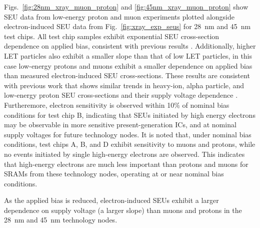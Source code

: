 Figs.~\ref{fig:28nm_xray_muon_proton} and \ref{fig:45nm_xray_muon_proton} show SEU data from low-energy proton and muon experiments plotted alongside electron-induced SEU data from Fig.~\ref{fig:xray_exp_seus} for 28~nm and 45~nm test chips. 
All test chip samples exhibit exponential SEU cross-section dependence on applied bias, consistent with previous results \cite{Rodbell:2007vl, Sierawski:2010cj}. 
Additionally, higher LET particles also exhibit a smaller slope than that of low LET particles, in this case low-energy protons and muons exhibit a smaller dependence on applied bias than measured electron-induced SEU cross-sections.
These results are consistent with previous work that shows similar trends in heavy-ion, alpha particle, and low-energy proton SEU cross-sections and their supply voltage dependence \cite{buehler1990alpha,barak1999scaling,barak2004use,Rodbell:2007vl}. 
Furtheremore, electron sensitivity is observed within 10\% of nominal bias conditions for test chip B, indicating that SEUs initiated by high energy electrons may be observable in more sensitive present-generation ICs, and at nominal supply voltages for future technology nodes.
It is noted that, under nominal bias conditions, test chips A, B, and D exhibit sensitivity to muons and protons, while no events initiated by single high-energy electrons are observed. 
This indicates that high-energy electrons are much less important than protons and muons for SRAMs from these technology nodes, operating at or near nominal bias conditions.

As the applied bias is reduced, electron-induced SEUs exhibit a larger dependence on supply voltage (a larger slope) than muons and protons in the 28~nm and 45~nm technology nodes.

